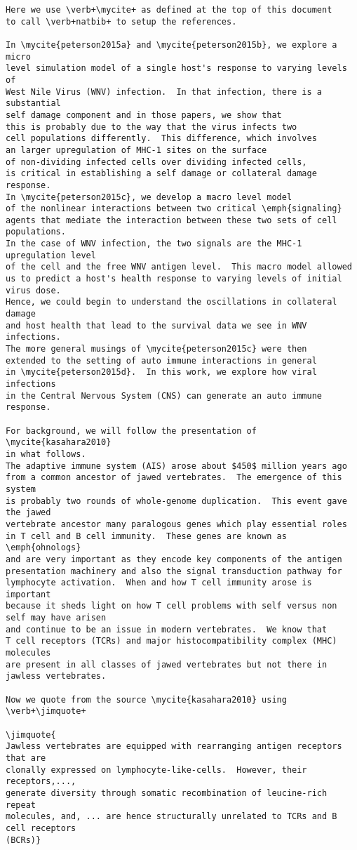 \documentclass[11pt]{SelfArxOneColBMN}
\begin{document}
\begin{lstlisting}
Here we use \verb+\mycite+ as defined at the top of this document
to call \verb+natbib+ to setup the references.

In \mycite{peterson2015a} and \mycite{peterson2015b}, we explore a micro
level simulation model of a single host's response to varying levels of
West Nile Virus (WNV) infection.  In that infection, there is a substantial
self damage component and in those papers, we show that
this is probably due to the way that the virus infects two
cell populations differently.  This difference, which involves
an larger upregulation of MHC-1 sites on the surface
of non-dividing infected cells over dividing infected cells,
is critical in establishing a self damage or collateral damage response.
In \mycite{peterson2015c}, we develop a macro level model
of the nonlinear interactions between two critical \emph{signaling}
agents that mediate the interaction between these two sets of cell populations.
In the case of WNV infection, the two signals are the MHC-1 upregulation level
of the cell and the free WNV antigen level.  This macro model allowed
us to predict a host's health response to varying levels of initial virus dose.
Hence, we could begin to understand the oscillations in collateral damage
and host health that lead to the survival data we see in WNV infections.
The more general musings of \mycite{peterson2015c} were then 
extended to the setting of auto immune interactions in general
in \mycite{peterson2015d}.  In this work, we explore how viral infections
in the Central Nervous System (CNS) can generate an auto immune
response.

For background, we will follow the presentation of \mycite{kasahara2010}
in what follows.
The adaptive immune system (AIS) arose about $450$ million years ago
from a common ancestor of jawed vertebrates.  The emergence of this system
is probably two rounds of whole-genome duplication.  This event gave the jawed
vertebrate ancestor many paralogous genes which play essential roles
in T cell and B cell immunity.  These genes are known as \emph{ohnologs}
and are very important as they encode key components of the antigen
presentation machinery and also the signal transduction pathway for
lymphocyte activation.  When and how T cell immunity arose is important
because it sheds light on how T cell problems with self versus non self may have arisen
and continue to be an issue in modern vertebrates.  We know that
T cell receptors (TCRs) and major histocompatibility complex (MHC) molecules
are present in all classes of jawed vertebrates but not there in jawless vertebrates.

Now we quote from the source \mycite{kasahara2010} using \verb+\jimquote+

\jimquote{
Jawless vertebrates are equipped with rearranging antigen receptors that are
clonally expressed on lymphocyte-like-cells.  However, their receptors,...,
generate diversity through somatic recombination of leucine-rich repeat
molecules, and, ... are hence structurally unrelated to TCRs and B cell receptors
(BCRs)}
\end{lstlisting}
\onehalfspacing
\lstset{fancyvrb=false}
\end{document}
